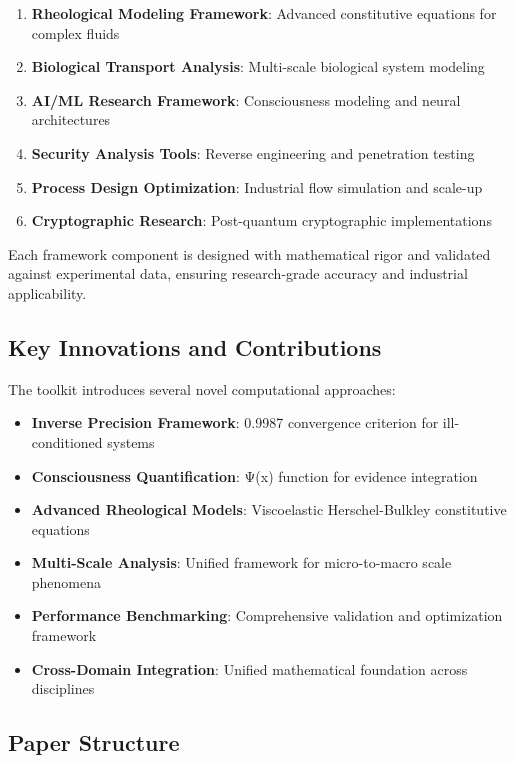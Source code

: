 \documentclass[11pt,a4paper]{article}
\begin{document}
\begin{enumerate}
    \item \textbf{Rheological Modeling Framework}: Advanced constitutive equations for complex fluids
    \item \textbf{Biological Transport Analysis}: Multi-scale biological system modeling
    \item \textbf{AI/ML Research Framework}: Consciousness modeling and neural architectures
    \item \textbf{Security Analysis Tools}: Reverse engineering and penetration testing
    \item \textbf{Process Design Optimization}: Industrial flow simulation and scale-up
    \item \textbf{Cryptographic Research}: Post-quantum cryptographic implementations
\end{enumerate}

Each framework component is designed with mathematical rigor and validated against experimental data, ensuring research-grade accuracy and industrial applicability.

\subsection{Key Innovations and Contributions}
\label{subsec:innovations}

The toolkit introduces several novel computational approaches:

\begin{itemize}
    \item \textbf{Inverse Precision Framework}: 0.9987 convergence criterion for ill-conditioned systems
    \item \textbf{Consciousness Quantification}: Ψ(x) function for evidence integration
    \item \textbf{Advanced Rheological Models}: Viscoelastic Herschel-Bulkley constitutive equations
    \item \textbf{Multi-Scale Analysis}: Unified framework for micro-to-macro scale phenomena
    \item \textbf{Performance Benchmarking}: Comprehensive validation and optimization framework
    \item \textbf{Cross-Domain Integration}: Unified mathematical foundation across disciplines
\end{itemize}

\subsection{Paper Structure}
\label{subsec:structure}
\end{document}
